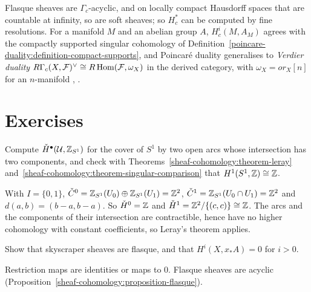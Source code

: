\begin{remark}\label{sheaf-cohomology:remark-compact-supports}
Flasque sheaves are $\Gamma_c$-acyclic, and on locally compact Hausdorff spaces that are countable at infinity, so are soft sheaves; so $H^*_c$ can be computed by fine resolutions. For
a manifold $M$ and an abelian group $A$, $H^i_c(M, A_M)$ agrees with the compactly supported singular cohomology of Definition~\ref{poincare-duality:definition-compact-supports}, and
Poincar\'e duality generalises to \emph{Verdier duality} $R\Gamma_c(X, \mathcal{F})^\vee \cong R\operatorname{Hom}(\mathcal{F}, \omega_X)$ in the derived category, with $\omega_X = \mathit{or}_X[n]$ for an
$n$-manifold \cite[Chapter III]{ks-sheaves-manifolds}, \cite{iversen-sheaves}.
\end{remark}

\section{Exercises}\label{sheaf-cohomology:section-exercises}

\begin{exercise}\label{sheaf-cohomology:exercise-cech-circle}
Compute $\check{H}^\bullet(\mathcal{U}, \mathbb{Z}_{S^1})$ for the cover of $S^1$ by two open arcs whose intersection has two components, and check with
Theorems~\ref{sheaf-cohomology:theorem-leray} and~\ref{sheaf-cohomology:theorem-singular-comparison} that $H^1(S^1, \mathbb{Z}) \cong \mathbb{Z}$.
\end{exercise}

\begin{solution}
With $I = \{0, 1\}$, $\check{C}^0 = \mathbb{Z}_{S^1}(U_0) \oplus \mathbb{Z}_{S^1}(U_1) = \mathbb{Z}^2$, $\check{C}^1 = \mathbb{Z}_{S^1}(U_0 \cap U_1) = \mathbb{Z}^2$ and $d(a, b) = (b - a, b - a)$. So $\check{H}^0 = \mathbb{Z}$ and
$\check{H}^1 = \mathbb{Z}^2/\{(c, c)\} \cong \mathbb{Z}$. The arcs and the components of their intersection are contractible, hence have no higher cohomology with constant coefficients, so Leray's theorem
applies.
\end{solution}

\begin{exercise}\label{sheaf-cohomology:exercise-skyscraper-flasque}
Show that skyscraper sheaves are flasque, and that $H^i(X, x_*A) = 0$ for $i > 0$.
\end{exercise}

\begin{solution}
Restriction maps are identities or maps to $0$. Flasque sheaves are acyclic (Proposition~\ref{sheaf-cohomology:proposition-flasque}).
\end{solution}


